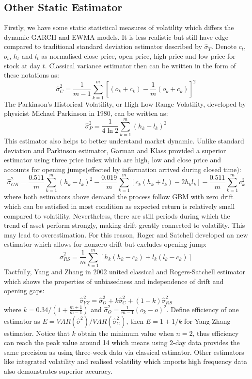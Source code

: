 \subsection{Other Static Estimator}\label{Section 5.1.2}
Firstly, we have some static statistical measures of volatility which differs the dynamic GARCH and EWMA models. It is less realistic but still have edge compared to traditional standard deviation estimator described by $\hat{\sigma}_{T}$. Denote $c_t$, $o_t$, $h_t$ and $l_t$ as normalised close price, open price, high price and low price for stock at day $t$. Classical variance estimator then can be written in the form of these notations as:
\begin{equation}
\hat{\sigma}_C^2=\frac{1}{m-1}\sum_{k=1}^{m}[(o_k+c_k)-\frac{1}{m}(o_k+c_k)]^2
\end{equation} 
The Parkinson's Historical Volatility, or High Low Range Volatility, developed by physicist Michael Parkinson in 1980, can be written as:
\squeezeupu
\begin{equation}
\hat{\sigma}_P^2=\frac{1}{4\ln{2}}\sum_{k=1}^{m}(h_k-l_k)^2
\end{equation} 
This estimator also helps to better understand market dynamic. Unlike standard deviation and Parkinson estimator, Garman and Klass provided a superior estimator using three price index which are high, low and close price and accounts for opening jumps(effected by information arrived during closed time):
\squeezeupu
\begin{equation}
\hat{\sigma}_{GK}^2=\frac{0.511}{m}\sum_{k=1}^{m}(h_k-l_k)^2-\frac{0.019}{m}\sum_{k=1}^{m}[c_k(h_k+l_k)-2h_kl_k]-\frac{0.511}{m}\sum_{k=1}^{m}c_k^2
\end{equation} 
where both estimators above demand the process follow GBM with zero drift which can be satisfied in most condition as expected return is relatively small compared to volatility. Nevertheless, there are still periods during which the trend of asset perform strongly, making drift greatly connected to volatility. This may lead to overestimation. For this reason, Roger and Satchell developed an new estimator which allows for nonzero drift but excludes opening jump:
\begin{equation}
\hat{\sigma}_{RS}^2=\frac{1}{m}\sum_{k=1}^{m}[h_k(h_k-c_k)+l_k(l_k-c_k)]
\end{equation} 
Tactfully, Yang and Zhang in 2002 united classical and Rogers-Satchell estimator which shows the properties of unbiasedness and independence of drift and opening gaps:
\begin{equation}
\hat{\sigma}_{YZ}^2=\hat{\sigma}_{O}^2+k\hat{\sigma}_{C}^2+(1-k)\hat{\sigma}_{RS}^2
\end{equation} 
where $k=0.34/(1+\frac{m+1}{m-1})$ and $\hat{\sigma}_{O}^2=\frac{1}{m-1}(o_k-\bar{o})^2$. Define efficiency of one estimator as $E=VAR(\hat{\sigma}^2)/VAR(\hat{\sigma}_C^2)$, then $E=1+1/k$ for Yang-Zhang estimator. Notice that $k$ obtain the minimum value when $n=2$, thus efficiency can reach the peak value around 14 which means using 2-day data provides the same precision as using three-week data via classical estimator. Other estimators like integrated volatility and realised volatility which imports high frequency data also demonstrates superior accuracy. 
